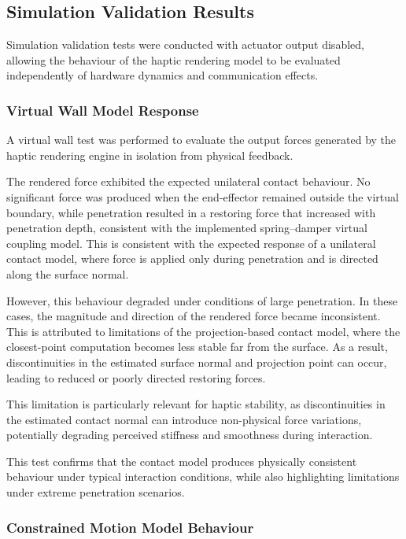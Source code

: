 \subsection{Simulation Validation Results}

Simulation validation tests were conducted with actuator output disabled, allowing the behaviour of the haptic rendering model to be evaluated independently of hardware dynamics and communication effects.

\subsubsection{Virtual Wall Model Response}

A virtual wall test was performed to evaluate the output forces generated by the haptic rendering engine in isolation from physical feedback.

The rendered force exhibited the expected unilateral contact behaviour. No significant force was produced when the end-effector remained outside the virtual boundary, while penetration resulted in a restoring force that increased with penetration depth, consistent with the implemented spring--damper virtual coupling model. This is consistent with the expected response of a unilateral contact model, where force is applied only during penetration and is directed along the surface normal.

However, this behaviour degraded under conditions of large penetration. In these cases, the magnitude and direction of the rendered force became inconsistent. This is attributed to limitations of the projection-based contact model, where the closest-point computation becomes less stable far from the surface. As a result, discontinuities in the estimated surface normal and projection point can occur, leading to reduced or poorly directed restoring forces.

This limitation is particularly relevant for haptic stability, as discontinuities in the estimated contact normal can introduce non-physical force variations, potentially degrading perceived stiffness and smoothness during interaction.

This test confirms that the contact model produces physically consistent behaviour under typical interaction conditions, while also highlighting limitations under extreme penetration scenarios.

\subsubsection{Constrained Motion Model Behaviour}


